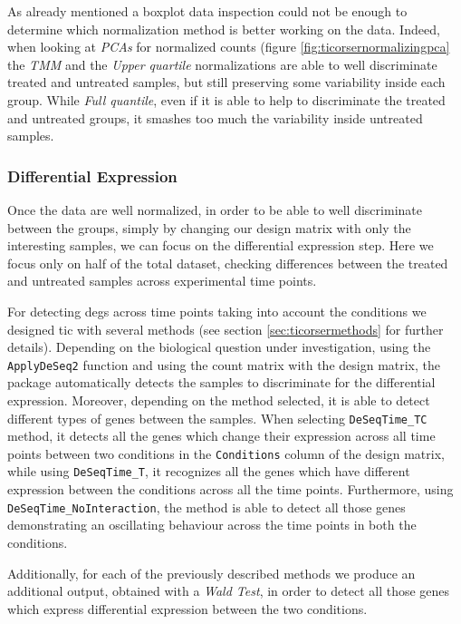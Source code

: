As already mentioned a boxplot data inspection could not be enough to determine which normalization method is better working on the data. 
Indeed, when looking at \textit{PCAs} for normalized counts (figure \ref{fig:ticorsernormalizingpca} the \textit{TMM} and the \textit{Upper quartile} normalizations are able to well discriminate treated and untreated samples, but still preserving some variability inside each group.
While \textit{Full quantile}, even if it is able to help to discriminate the treated and untreated groups, it smashes too much the variability inside untreated samples.

\subsubsection{Differential Expression}
Once the data are well normalized, in order to be able to well discriminate between the groups, simply by changing our design matrix with only the interesting samples, we can focus on the differential expression step.
Here we focus only on half of the total dataset, checking differences between the treated and untreated samples across experimental time points.

For detecting \glspl{deg} across time points taking into account the conditions we designed \gls{tic} with several methods (see section \ref{sec:ticorsermethods} for further details).
Depending on the biological question under investigation, using the \lstinline!ApplyDeSeq2! function and using the count matrix with the design matrix, the package automatically detects the samples to discriminate for the differential expression.
Moreover, depending on the method selected, it is able to detect different types of genes between the samples.
When selecting \lstinline!DeSeqTime_TC! method, it detects all the genes which change their expression across all time points between two conditions in the \lstinline!Conditions! column of the design matrix, while using \lstinline!DeSeqTime_T!, it recognizes all the genes which have different expression between the conditions across all the time points. 
Furthermore, using \lstinline!DeSeqTime_NoInteraction!, the method is able to detect all those genes demonstrating an oscillating behaviour across the time points in both the conditions.

Additionally, for each of the previously described methods we produce an additional output, obtained with a \textit{Wald Test}, in order to detect all those genes which express differential expression between the two conditions.

